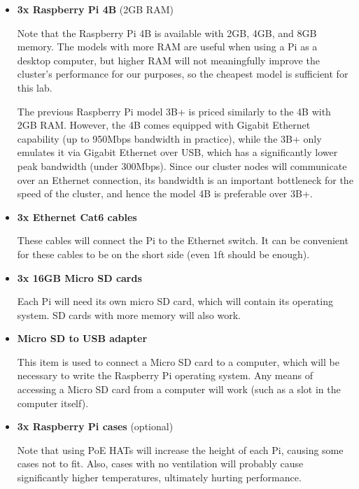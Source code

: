 \documentclass{article}
\begin{document}
\begin{itemize}
    \item \textbf{3x Raspberry Pi 4B} (2GB RAM)
    
    Note that the Raspberry Pi 4B is available with 2GB, 4GB, and 8GB memory. The models with more RAM are useful when using a Pi as a desktop computer, but higher RAM will not meaningfully improve the cluster's performance for our purposes, so the cheapest model is sufficient for this lab.
    
    The previous Raspberry Pi model 3B+ is priced similarly to the 4B with 2GB RAM. However, the 4B comes equipped with Gigabit Ethernet capability (up to 950Mbps bandwidth in practice), while the 3B+ only emulates it via Gigabit Ethernet over USB, which has a significantly lower peak bandwidth (under 300Mbps). Since our cluster nodes will communicate over an Ethernet connection, its bandwidth is an important bottleneck for the speed of the cluster, and hence the model 4B is preferable over 3B+.
        
    \item \textbf{3x Ethernet Cat6 cables}
    
    These cables will connect the Pi to the Ethernet switch. It can be convenient for these cables to be on the short side (even $1$ft should be enough).
    
    \item \textbf{3x 16GB Micro SD cards}
    
    Each Pi will need its own micro SD card, which will contain its operating system. SD cards with more memory will also work.
    
    \item \textbf{Micro SD to USB adapter}
    
    This item is used to connect a Micro SD card to a computer, which will be necessary to write the Raspberry Pi operating system. Any means of accessing a Micro SD card from a computer will work (such as a slot in the computer itself).
    
    \item \textbf{3x Raspberry Pi cases} (optional)
    
    Note that using PoE HATs will increase the height of each Pi, causing some cases not to fit. Also, cases with no ventilation will probably cause significantly higher temperatures, ultimately hurting performance.
    
\end{itemize}
\end{document}
